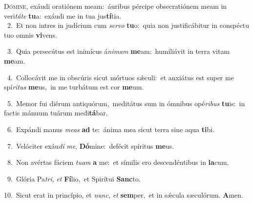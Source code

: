 \lettrine{\initial\textcolor{\initialcolor}{D}}{ómine,} exáudi oratiónem meam:~\dagger áuribus pércipe obsecratiónem meam in veri\-\textit{tá}\-\textit{te} \textbf{tu}\-a:~\star exáudi me in tua jus\-\textbf{tí}\-tia.\\
{\numbfont\textcolor{\numbcolor}{~2.}}~Et non intres in judícium cum \textit{ser}\-\textit{vo} \textbf{tu}\-o:~\star quia non justificábitur in conspéctu tuo omnis \textbf{vi}\-vens.\par
{\numbfont\textcolor{\numbcolor}{~3.}}~Quia persecútus est inimícus á\-\textit{ni}\-\textit{mam} \textbf{me}\-am:~\star humiliávit in terra vitam \textbf{me}\-am.\par
{\numbfont\textcolor{\numbcolor}{~4.}}~Collocávit me in obscúris sicut mórtuos sǽculi:~\dagger et anxiátus est super me spí\-\textit{ri}\-\textit{tus} \textbf{me}\-us,~\star in me turbátum est cor \textbf{me}\-um.\par
{\numbfont\textcolor{\numbcolor}{~5.}}~Memor fui diérum antiquórum,~\dagger meditátus sum in ómnibus opé\-\textit{ri}\-\textit{bus} \textbf{tu}\-is:~\star in factis mánuum tuárum medi\-\textbf{tá}\-bar.\par
{\numbfont\textcolor{\numbcolor}{~6.}}~Expándi manus \textit{me}\-\textit{as} \textbf{ad} te:~\star ánima mea sicut terra sine aqua \textbf{ti}\-bi.\par
{\numbfont\textcolor{\numbcolor}{~7.}}~Velóciter exáu\textit{di} \textit{me}\-, \textbf{Dó}\-mine:~\star defécit spíritus \textbf{me}\-us.\par
{\numbfont\textcolor{\numbcolor}{~8.}}~Non avértas fáciem \textit{tu}\-\textit{am} \textbf{a} me:~\star et símilis ero descendéntibus in \textbf{la}\-cum.\par
{\numbfont\textcolor{\numbcolor}{~9.}}~Glória Pa\-\textit{tri}\-, \textit{et} \textbf{Fí}\-lio,~\star et Spirítui \textbf{Sanc}\-to.\par
{\numbfont\textcolor{\numbcolor}{10.}}~Sicut erat in princípio, et \textit{nunc}\-, \textit{et} \textbf{sem}\-per,~\star et in sǽcula sæculórum. \textbf{A}\-men.\par
